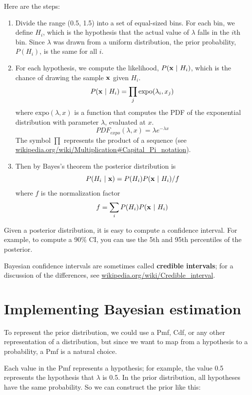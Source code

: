 \documentclass[12pt]{book}
\begin{document}
Here are the steps:

\begin{enumerate}

\item Divide the range (0.5, 1.5) into a set of equal-sized bins.
For each bin, we define $H_i$, which is the hypothesis that the
actual value of $\lambda$ falls in the $i$th bin.
Since $\lambda$ was drawn from a uniform distribution, the prior
probability, $P(H_i)$, is the same for all $i$.

\item For each hypothesis, we compute the likelihood, $P(\mathbf{x} ~|~ H_i)$,
which is the chance of drawing the sample $\mathbf{x}$ given $H_i$.
%
\[ P(\mathbf{x} ~|~ H_i) = \prod_j \mathrm{expo}(\lambda_i, x_j)  \]
%
where $\mathrm{expo}(\lambda, x)$ is a function that
computes the PDF of the exponential distribution with parameter $\lambda$,
evaluated at $x$.  
%
\[ PDF_{expo}(\lambda, x) = \lambda e^{-\lambda x}\]
%
The symbol $\prod$ represents the product of a sequence (see
\url{wikipedia.org/wiki/Multiplication#Capital_Pi_notation}).

\item Then by Bayes's theorem the posterior distribution is
%
\[ P(H_i ~|~ \mathbf{x}) =  P(H_i) P(\mathbf{x} ~|~ H_i) / f \]
%
where $f$ is the normalization factor
%
\[ f = \sum_i P(H_i) P(\mathbf{x} ~|~ H_i) \]
%
\end{enumerate}

Given a posterior distribution, it is easy to compute a confidence
interval.  For example, to compute a 90\% CI, you can
use the 5th and 95th percentiles of the posterior.


Bayesian confidence intervals are sometimes called {\bf credible
intervals}; for a discussion of the differences, see
\url{wikipedia.org/wiki/Credible_interval}.


\section{Implementing Bayesian estimation}

To represent the prior distribution, we could use a Pmf, Cdf, or
any other representation of a distribution, but since we want to
map from a hypothesis to a probability, a Pmf is a natural choice.


Each value in the Pmf represents a hypothesis; for example, the
value 0.5 represents the hypothesis that $\lambda$ is 0.5.
In the prior distribution, all hypotheses have the same probability.
So we can construct the prior like this:
\end{document}
